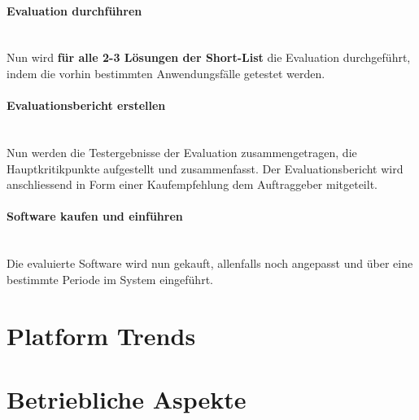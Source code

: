\documentclass[a4paper, 11pt]{article}
\begin{document}
\paragraph{Evaluation durchführen}\mbox{}\\
Nun wird \textbf{für alle 2-3 Lösungen der Short-List} die Evaluation durchgeführt, indem die vorhin bestimmten Anwendungsfälle getestet werden.

\paragraph{Evaluationsbericht erstellen}\mbox{}\\
Nun werden die Testergebnisse der Evaluation zusammengetragen, die Hauptkritikpunkte aufgestellt und zusammenfasst. Der Evaluationsbericht wird anschliessend in Form einer Kaufempfehlung dem Auftraggeber mitgeteilt.

\paragraph{Software kaufen und einführen}\mbox{}\\
Die evaluierte Software wird nun gekauft, allenfalls noch angepasst und über eine bestimmte Periode im System eingeführt.

\newpage

\section{Platform Trends}

\section{Betriebliche Aspekte}
\end{document}
